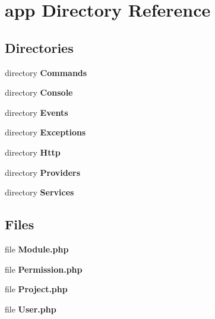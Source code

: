 \section{app Directory Reference}
\label{dir_f15f6c71dfae1e5f84b82641d8a96b85}
\subsection*{Directories}
\begin{DoxyCompactItemize}
\item 
directory {\bf Commands}
\item 
directory {\bf Console}
\item 
directory {\bf Events}
\item 
directory {\bf Exceptions}
\item 
directory {\bf Http}
\item 
directory {\bf Providers}
\item 
directory {\bf Services}
\end{DoxyCompactItemize}
\subsection*{Files}
\begin{DoxyCompactItemize}
\item 
file {\bf Module.\+php}
\item 
file {\bf Permission.\+php}
\item 
file {\bf Project.\+php}
\item 
file {\bf User.\+php}
\end{DoxyCompactItemize}
